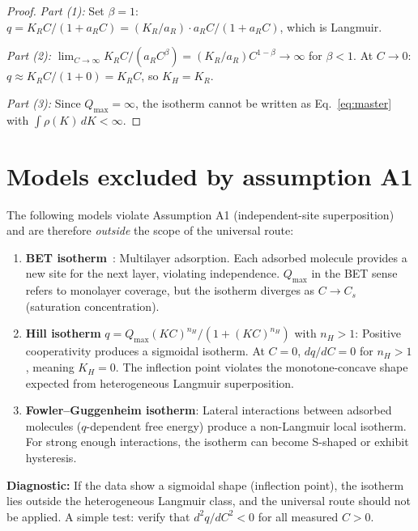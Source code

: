 \documentclass[12pt]{article}
\begin{document}
\begin{proof}
\textit{Part (1):} Set $\beta=1$:
$q=K_R C/(1+a_R C)=(K_R/a_R)\cdot a_R C/(1+a_R C)$, which is
Langmuir.

\textit{Part (2):}
$\lim_{C\to\infty}K_R C/(a_R C^\beta)
=(K_R/a_R)C^{1-\beta}\to\infty$ for $\beta<1$.
At $C\to 0$: $q\approx K_R C/(1+0)=K_R C$, so $K_H=K_R$.

\textit{Part (3):}
Since $Q_{\max}=\infty$, the isotherm cannot be written as
Eq.~\eqref{eq:master} with $\int\rho(K)\,dK<\infty$.
\end{proof}

\section{Models excluded by assumption A1}
\label{sec:excluded}

The following models violate Assumption A1
(independent-site superposition) and are therefore \emph{outside}
the scope of the universal route:

\begin{enumerate}[nosep]
  \item \textbf{BET isotherm}~\cite{BET1938}:
        Multilayer adsorption.  Each adsorbed molecule provides a
        new site for the next layer, violating independence.
        $Q_{\max}$ in the BET sense refers to monolayer coverage,
        but the isotherm diverges as $C\to C_s$ (saturation
        concentration).

  \item \textbf{Hill isotherm}
        $q=Q_{\max}(KC)^{n_H}/(1+(KC)^{n_H})$ with $n_H>1$:
        Positive cooperativity produces a sigmoidal isotherm.
        At $C=0$, $dq/dC=0$ for $n_H>1$, meaning $K_H=0$.
        The inflection point violates the monotone-concave shape
        expected from heterogeneous Langmuir superposition.

  \item \textbf{Fowler--Guggenheim isotherm}:
        Lateral interactions between adsorbed molecules
        ($q$-dependent free energy) produce a non-Langmuir local
        isotherm.  For strong enough interactions, the isotherm
        can become S-shaped or exhibit hysteresis.
\end{enumerate}

\textbf{Diagnostic:}
If the data show a sigmoidal shape (inflection point), the isotherm
lies outside the heterogeneous Langmuir class, and the universal
route should not be applied.  A simple test: verify that $d^2 q/dC^2<0$
for all measured $C>0$.
\end{document}
